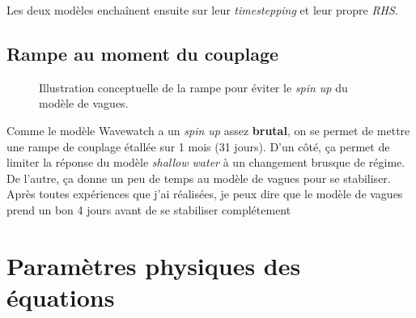 \documentclass[10pt]{report}
\numberwithin{equation}{section}
\begin{document}
Les deux modèles enchaînent ensuite sur leur \emph{timestepping} et leur propre \emph{RHS}.

\section{Rampe au moment du couplage}
\label{sec:orgb5b5b2d}

\begin{figure}
\begin{center}
\end{center}
\caption{\label{orge1677c2}Illustration conceptuelle de la rampe pour éviter le \emph{spin up} du modèle de vagues.}
\end{figure}

Comme le modèle Wavewatch a un \emph{spin up} assez \textbf{brutal}, on se permet de mettre une rampe de couplage étallée sur 1 mois (31 jours).
D'un côté, ça permet de limiter la réponse du modèle \emph{shallow water} à un changement brusque de régime.
De l'autre, ça donne un peu de temps au modèle de vagues pour se stabiliser.
Après toutes expériences que j'ai réalisées, je peux dire que le modèle de vagues prend un bon 4 jours avant de se stabiliser complétement

\chapter{Paramètres physiques des équations}
\label{sec:orgdfb7d08}
\end{document}
